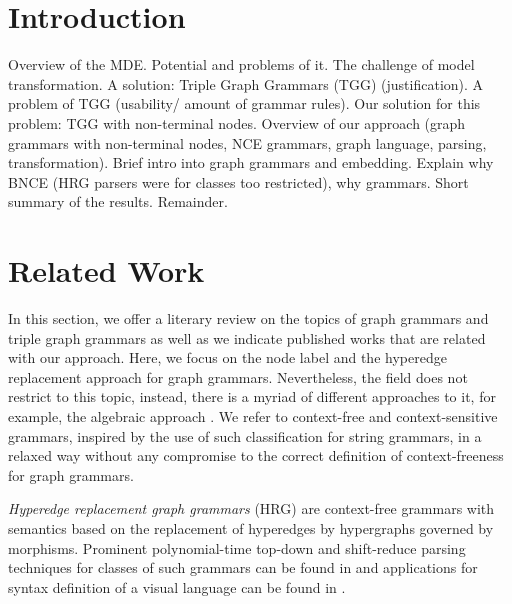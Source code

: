 \documentclass[]{report}
\title{}
\author{William Bombardelli da Silva}
\begin{document}
\maketitle

\begin{abstract}
\end{abstract}

\tableofcontents
\newpage

\section{Introduction}
Overview of the MDE. Potential and problems of it. The challenge of model transformation. A solution: Triple Graph Grammars (TGG) (justification). A problem of TGG (usability/ amount of grammar rules). Our solution for this problem: TGG with non-terminal nodes. Overview of our approach (graph grammars with non-terminal nodes, NCE grammars, graph language, parsing, transformation). Brief intro into graph grammars and embedding. Explain why BNCE (HRG parsers were for classes too restricted), why grammars. Short summary of the results. Remainder.

\section{Related Work}
In this section, we offer a literary review on the topics of graph grammars and triple graph grammars as well as we indicate published works that are related with our approach. Here, we focus on the node label and the hyperedge replacement approach for graph grammars. Nevertheless, the field does not restrict to this topic, instead, there is a myriad of different approaches to it, for example, the algebraic approach \cite{ehrig1999handbook}. We refer to context-free and context-sensitive grammars, inspired by the use of such classification for string grammars, in a relaxed way without any compromise to the correct definition of context-freeness for graph grammars.

\textit{Hyperedge replacement graph grammars} (HRG) are context-free grammars with semantics based on the replacement of hyperedges by hypergraphs \cite{drewes1997hyperedge} governed by morphisms. Prominent polynomial-time top-down and shift-reduce parsing techniques for classes of such grammars can be found in \cite{drewes2015predictive,drewes2017predictive,bjorklund2016between,chiang2013parsing} and applications for syntax definition of a visual language can be found in \cite{minas2006syntax,engelfriet1998tree}.
\end{document}
